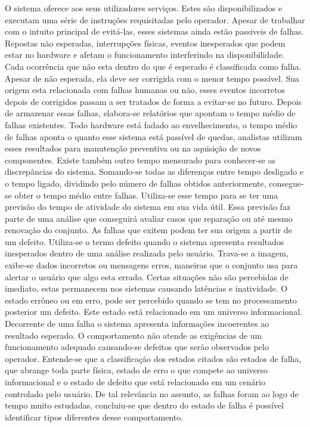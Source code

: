 O sistema oferece aos seus utilizadores serviços. Estes são disponibilizados e executam uma série de instruções requisitadas pelo operador.
Apesar de trabalhar com o intuito principal de evitá-las, esses sistemas ainda estão passiveis de falhas. Repostas não esperadas, interrupções físicas, eventos inesperados que podem estar no hardware e afetam o funcionamento interferindo na disponibilidade. Cada ocorrência que não esta dentro do que é esperado é classificada como falha. Apesar de não esperada, ela deve ser corrigida com o menor tempo possível. Sua origem esta relacionada com falhas humanas ou não, esses eventos incorretos depois de corrigidos passam a ser tratados de forma a evitar-se no futuro. Depois de armazenar essas falhas, elabora-se relatórios que apontam o tempo médio de falhas existentes. Todo hardware está fadado ao envelhecimento, o tempo médio de falhas aponta o quanto esse sistema está passível de quedas, analistas utilizam esses resultados para manutenção preventiva ou na aquisição de novos componentes.
Existe também outro tempo mensurado para conhecer-se as discrepâncias do sistema. Somando-se todas as diferenças entre tempo desligado e o tempo ligado, dividindo pelo número de falhas obtidos anteriormente, consegue-se obter o tempo médio entre falhas. Utiliza-se esse tempo para se ter uma previsão do tempo de atividade do sistema em sua vida útil. Essa previsão faz parte de uma análise que conseguirá avaliar casos que reparação ou até mesmo renovação do conjunto.
As falhas que exitem podem ter sua origem a partir de um defeito. Utiliza-se o termo defeito quando o sistema apresenta resultados inesperados dentro de uma análise realizada pelo usuário. Trava-se a imagem, exibe-se dados incorretos ou mensagens erros, maneiras que o conjunto usa para alertar o usuário que algo esta errado. Certas situações não são percebidas de imediato, estas permanecem nos sistemas causando latências e inatividade.
O estado errôneo ou em erro, pode ser percebido quando se tem no processamento posterior um defeito. Este estado está relacionado em um universo informacional. Decorrente de uma falha o sistema apresenta informações incoerentes ao resultado esperado. O comportamento não atende as exigências de um funcionamento adequado causando-se defeitos que serão observados pelo operador. Entende-se que a classificação dos estados citados são estados de falha, que abrange toda parte física, estado de erro o que compete ao universo informacional e o estado de defeito que está relacionado em um cenário controlado pelo usuário.
De tal relevância no assunto, as falhas foram ao logo de tempo muito estudadas, concluiu-se que dentro do estado de falha é possível identificar tipos diferentes desse comportamento.

